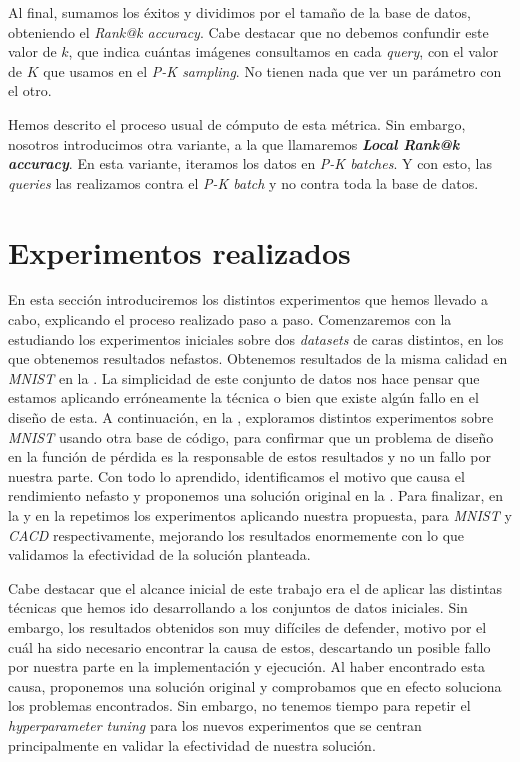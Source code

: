 Al final, sumamos los éxitos y dividimos por el tamaño de la base de datos, obteniendo el \textit{Rank@k accuracy}. Cabe destacar que no debemos confundir este valor de $k$, que indica cuántas imágenes consultamos en cada \textit{query}, con el valor de $K$ que usamos en el \textit{P-K sampling}. No tienen nada que ver un parámetro con el otro.

Hemos descrito el proceso usual de cómputo de esta métrica. Sin embargo, nosotros introducimos otra variante, a la que llamaremos \textbf{\textit{Local Rank@k accuracy}}. En esta variante, iteramos los datos en \textit{P-K batches}. Y con esto, las \textit{queries} las realizamos contra el \textit{P-K batch} y no contra toda la base de datos.


\section{Experimentos realizados}

En esta sección introduciremos los distintos experimentos que hemos llevado a cabo, explicando el proceso realizado paso a paso. Comenzaremos con la  estudiando los experimentos iniciales sobre dos \textit{datasets} de caras distintos, en los que obtenemos resultados nefastos. Obtenemos resultados de la misma calidad en \textit{MNIST} en la . La simplicidad de este conjunto de datos nos hace pensar que estamos aplicando erróneamente la técnica o bien que existe algún fallo en el diseño de esta. A continuación, en la , exploramos distintos experimentos sobre \textit{MNIST} usando otra base de código, para confirmar que un problema de diseño en la función de pérdida es la responsable de estos resultados y no un fallo por nuestra parte. Con todo lo aprendido, identificamos el motivo que causa el rendimiento nefasto y proponemos una solución original en la . Para finalizar, en la  y en la  repetimos los experimentos aplicando nuestra propuesta, para \textit{MNIST} y \textit{CACD} respectivamente, mejorando los resultados enormemente con lo que validamos la efectividad de la solución planteada.

Cabe destacar que el alcance inicial de este trabajo era el de aplicar las distintas técnicas que hemos ido desarrollando a los conjuntos de datos iniciales. Sin embargo, los resultados obtenidos son muy difíciles de defender, motivo por el cuál ha sido necesario encontrar la causa de estos, descartando un posible fallo por nuestra parte en la implementación y ejecución. Al haber encontrado esta causa, proponemos una solución original y comprobamos que en efecto soluciona los problemas encontrados. Sin embargo, no tenemos tiempo para repetir el \textit{hyperparameter tuning} para los nuevos experimentos que se centran principalmente en validar la efectividad de nuestra solución.

